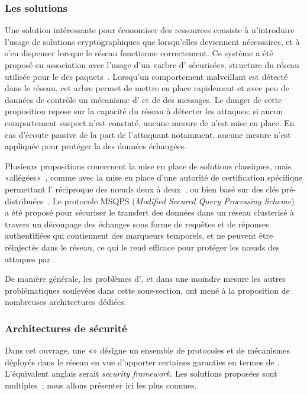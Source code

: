     \subsubsection{Les solutions}
Une solution intéressante pour économiser des ressources consiste à n'introduire l'usage de solutions cryptographiques que lorsqu'elles deviennent nécessaires, et à s'en dispenser lorsque le réseau fonctionne correctement.
Ce système a été proposé en association avec l'usage d'un «arbre d' sécurisée», structure du réseau utilisée pour le  des paquets~\cite{WDSX07}.
Lorsqu'un comportement malveillant est détecté dans le réseau, cet arbre permet de mettre en place rapidement et avec peu de données de contrôle un mécanisme d' et de  des messages.
Le danger de cette proposition repose sur la capacité du réseau à détecter les attaques: si aucun comportement suspect n'est constaté, aucune mesure de \secu n'est mise en place.
En cas d'écoute passive de la part de l'attaquant notamment, aucune mesure n'est appliquée pour protéger la  des données échangées.

Plusieurs propositions concernent la mise en place de solutions classiques, mais «allégées»~\cite{HWMRKP06}, comme avec la mise en place d'une autorité de certification spécifique permettant l' réciproque des nœuds deux à deux~\cite{GWZCK13}, ou bien basé sur des clés pré-distribuées~\cite{BSK13}.
Le protocole MSQPS (\textit{Modified Secured Query Processing Scheme})~\cite{GD14} a été proposé pour sécuriser le transfert des données dans un réseau clusterisé à travers un découpage des échanges sous forme de requêtes et de réponses authentifiées qui contiennent des marqueurs temporels, et ne peuvent être réinjectés dans le réseau, ce qui le rend efficace pour protéger les nœuds des attaques par .

De manière générale, les problèmes d', et dans une moindre mesure les autres problématiques soulevées dans cette sous-section, ont mené à la proposition de nombreuses architectures dédiées.

    \subsubsection{Architectures de sécurité}\label{ea:sss:archi}
Dans cet ouvrage, une «» désigne un ensemble de protocoles et de mécanismes déployés dans le réseau en vue d'apporter certaines garanties en termes de \secu.
L'équivalent anglais serait \textit{security framework}.
Les solutions proposées sont multiples~\cite{HI12,GWZC13,SS14-rev}; nous allons présenter ici les plus connues.


